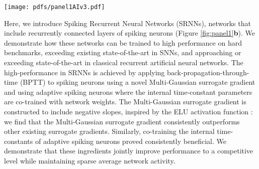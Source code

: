 \documentclass[fleqn,10pt]{wlscirep}
\begin{document}
\begin{figure*}[hbt!]
\centering
\texttt{[image: pdfs/panel1AIv3.pdf]}
\caption{\textbf{a}, Top: a classical artificial neural unit computes a weighted sum over input activations and then computes an output activation from this sum using a non-linear transfer function . Time is modeled as iterated recomputation of the network graph. Bottom: Spiking neurons receive spikes that are weighted and added to the internal state (membrane potential) that further develops through time following differential equations. When the membrane potential crosses a threshold, a spike is emitted and the potential is reset. \textbf{b}, Example architecture of a Spiking Recurrent Neural Network: an input layer projects to a layer of recurrently connected spiking neurons.  Recurrent layers then project to a read-out layer. Multiple recurrent layers can be connected in a feedforward fashion, here shown for two recurrent layers. \textbf{c}, The decaying threshold and membrane potential of the LIF and ALIF neurons can be modeled as an internal state induced by self-recurrency. \textbf{d}, Roll-out of the computational graph of a spiking neuron as used for backpropagation-through-time. \textbf{e}, Illustration of different surrogate gradient functions  as a function of the neuron's membrane potential and threshold.
}
\label{fig:panel1}
\end{figure*}

Here, we introduce Spiking Recurrent Neural Networks (SRNNs), networks that include recurrently connected layers of spiking neurons (Figure \ref{fig:panel1}\textbf{b}). We demonstrate how these networks can be trained to high performance on hard benchmarks, exceeding existing state-of-the-art in SNNs, and approaching or exceeding state-of-the-art in classical recurrent artificial neural networks. The high-performance in SRNNs is achieved by applying back-propagation-through-time (BPTT)\cite{werbos1990backpropagation} to spiking neurons using a novel Multi-Gaussian surrogate gradient and using adaptive spiking neurons where the internal time-constant parameters are co-trained with network weights. The Multi-Gaussian surrogate gradient is constructed to include negative slopes, inspired by the ELU activation function \cite{clevert2015fast}: we find that the Multi-Gaussian surrogate gradient consistently outperforms other existing surrogate gradients. Similarly, co-training the internal time-constants of adaptive spiking neurons proved consistently beneficial. We demonstrate that these ingredients jointly improve performance to a competitive level while maintaining sparse average network activity. 
\end{document}
